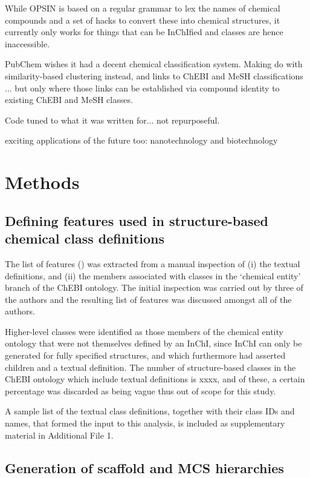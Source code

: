 \documentclass[10pt]{bmc_article}
\newenvironment{bmcformat}{\baselineskip20pt\sloppy\setboolean{publ}{false}}{\baselineskip20pt\sloppy}
\begin{document}
\begin{bmcformat}
While OPSIN is based on a regular grammar to lex the names of chemical compounds and a set of hacks to convert these into chemical structures, it currently only works for things that can be InChIfied and classes are hence inaccessible.

PubChem wishes it had a decent chemical classification system. Making do with similarity-based clustering instead, and links to ChEBI and MeSH classifications ... but only where those links can be established via compound identity to existing ChEBI and MeSH classes. 

Code tuned to what it was written for... not repurposeful. 

exciting applications of the future too: nanotechnology and biotechnology 



\section*{Methods}

\subsection*{Defining features used in structure-based chemical class definitions}

The list of features () was extracted from a manual inspection of (i) the textual definitions, and (ii) the members associated with classes in the `chemical entity' branch of the ChEBI ontology. The initial inspection was carried out by three of the authors and the resulting list of features was discussed amongst all of the authors. 

Higher-level classes were identified as those members of the chemical entity ontology that were not themselves defined by an InChI, since InChI can only be generated for fully specified structures, and which furthermore had asserted children and a textual definition.  The number of structure-based classes in the ChEBI ontology which include textual definitions is xxxx, and of these, a certain percentage was discarded as being vague thus out of scope for this study. 

A sample list of the textual class definitions, together with their class IDs and names, that formed the input to this analysis, is included as supplementary material in Additional File 1. %


\subsection*{Generation of scaffold and MCS hierarchies}


\end{bmcformat}
\end{document}
